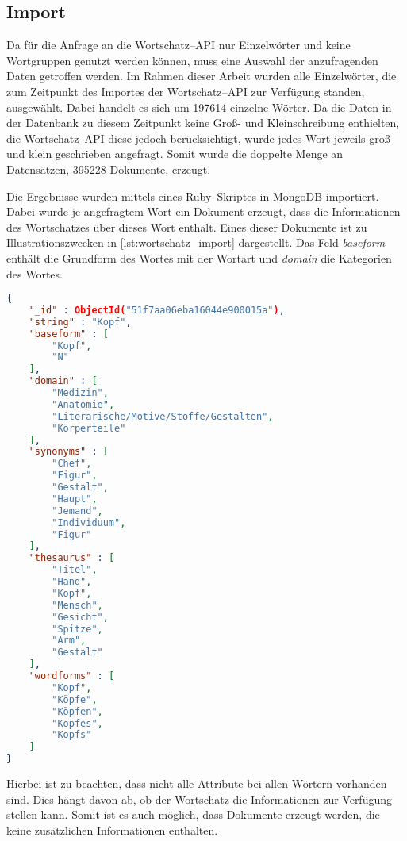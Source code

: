 \subsection{Import}

Da für die Anfrage an die Wortschatz--API nur Einzelwörter und keine Wortgruppen genutzt werden können, muss eine Auswahl der anzufragenden Daten getroffen werden. Im Rahmen dieser Arbeit wurden alle Einzelwörter, die zum Zeitpunkt des Importes der Wortschatz--API zur Verfügung standen, ausgewählt. Dabei handelt es sich um \num{197614} einzelne Wörter. Da die Daten in der Datenbank zu diesem Zeitpunkt keine Groß- und Kleinschreibung enthielten, die Wortschatz--API diese jedoch berücksichtigt, wurde jedes Wort jeweils groß und klein geschrieben angefragt. Somit wurde die doppelte Menge an Datensätzen, \num{395228} Dokumente, erzeugt.

Die Ergebnisse wurden mittels eines Ruby--Skriptes in MongoDB importiert. Dabei wurde je angefragtem Wort ein Dokument erzeugt, dass die Informationen des Wortschatzes über dieses Wort enthält. Eines dieser Dokumente ist zu Illustrationszwecken in \cref{lst:wortschatz_import} dargestellt. Das Feld \emph{baseform} enthält die Grundform des Wortes mit der Wortart und \emph{domain} die Kategorien des Wortes.

\begin{lstlisting}[language=json, label={lst:wortschatz_import}, caption={Wortschatz--Dokument nach dem Import}]
{
    "_id" : ObjectId("51f7aa06eba16044e900015a"),
    "string" : "Kopf",
    "baseform" : [ 
        "Kopf", 
        "N"
    ],
    "domain" : [ 
        "Medizin", 
        "Anatomie", 
        "Literarische/Motive/Stoffe/Gestalten", 
        "Körperteile"
    ],
    "synonyms" : [  
        "Chef", 
        "Figur", 
        "Gestalt", 
        "Haupt", 
        "Jemand", 
        "Individuum", 
        "Figur"
    ],
    "thesaurus" : [ 
        "Titel", 
        "Hand", 
        "Kopf", 
        "Mensch", 
        "Gesicht", 
        "Spitze", 
        "Arm", 
        "Gestalt"
    ],
    "wordforms" : [ 
        "Kopf", 
        "Köpfe", 
        "Köpfen", 
        "Kopfes", 
        "Kopfs"
    ]
}
\end{lstlisting}

Hierbei ist zu beachten, dass nicht alle Attribute bei allen Wörtern vorhanden sind. Dies hängt davon ab, ob der Wortschatz die Informationen zur Verfügung stellen kann. Somit ist es auch möglich, dass Dokumente erzeugt werden, die keine zusätzlichen Informationen enthalten.

